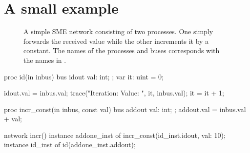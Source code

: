 \section{A small example}
\label{sec:smeilex}
\begin{figure}
  \centering
    \caption{A simple SME network consisting of two processes. One simply
      forwards the received value while the other increments it by a
      constant. The names of the processes and buses corresponds with the names
      in .}
  \label{fig:addone}
\end{figure}
\begin{widefigure}
\begin{smeilcode2}
proc id(in inbus)
  bus idout {
    val: int;
  };
  var it: uint = 0;
{
  idout.val = inbus.val;
  trace("Iteration: {} Value: {}",
    it, inbus.val);
  it = it + 1;

}



proc incr_const(in inbus, const val)
  bus addout {
     val: int;
  };
{
  addout.val = inbus.val + val;
}

network incr() {
  instance addone_inst of
    incr_const(id_inst.idout, val: 10);
  instance id_inst of
    id(addone_inst.addout);
}
\end{smeilcode2}
\caption{An example program written in SMEIL.}
\label{fig:addone.sme}
\end{widefigure}


